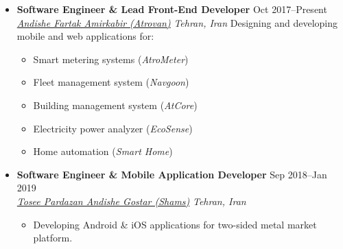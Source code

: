 \documentclass[11pt,a4paper,roman]{moderncv} %
\newcommand*{\authorimg}[1]{%
	\raisebox{-.3\baselineskip}{%
		\texttt{[image: \#1]}%
	}%
}
\begin{document}
\begin{itemize}
	\item \textbf{Software Engineer \& Lead Front-End Developer} \hfill Oct 2017--Present \\
	\href{https://atrovan.com}{\authorimg{pictures/atrovan.png} \emph{Andishe Fartak Amirkabir (Atrovan)}} \hfill \emph{Tehran, Iran}
	\vspace{1mm}
	\linebreak
	Designing and developing mobile and web applications for:
	\begin{itemize}
		\item Smart metering systems (\emph{AtroMeter})
		\item Fleet management system (\emph{Navgoon})
		\item Building management system (\emph{AtCore})
		\item Electricity power analyzer (\emph{EcoSense})
		\item Home automation (\emph{Smart Home})
	\end{itemize}
	
	\vspace{3pt}
	
	\item \textbf{Software Engineer \& Mobile Application Developer} \hfill Sep 2018--Jan 2019 \\
	\href{http://shamstech.ir}{\authorimg{pictures/shams.png} \emph{Tosee Pardazan Andishe Gostar (Shams)}} \hfill \emph{Tehran, Iran}
	
	\begin{itemize}
		\item Developing Android \& iOS applications for two-sided metal market platform.
	\end{itemize}
\end{itemize}

\end{document}
